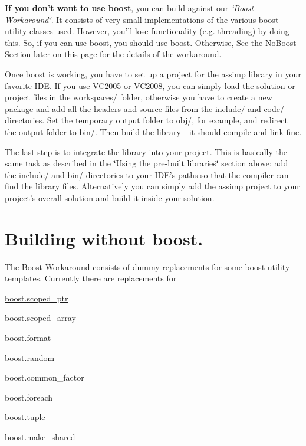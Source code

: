 {\bfseries If you don't want to use boost}, you can build against our {\itshape \char`\"{}\+Boost-\/\+Workaround\char`\"{}}. It consists of very small implementations of the various boost utility classes used. However, you'll lose functionality (e.\+g. threading) by doing this. So, if you can use boost, you should use boost. Otherwise, See the \hyperlink{install_use_noboost}{No\+Boost-\/\+Section } later on this page for the details of the workaround.

Once boost is working, you have to set up a project for the assimp library in your favorite I\+D\+E. If you use V\+C2005 or V\+C2008, you can simply load the solution or project files in the workspaces/ folder, otherwise you have to create a new package and add all the headers and source files from the include/ and code/ directories. Set the temporary output folder to obj/, for example, and redirect the output folder to bin/. Then build the library -\/ it should compile and link fine.

The last step is to integrate the library into your project. This is basically the same task as described in the \char`\"{}\+Using the pre-\/built libraries\char`\"{} section above\+: add the include/ and bin/ directories to your I\+D\+E's paths so that the compiler can find the library files. Alternatively you can simply add the assimp project to your project's overall solution and build it inside your solution.\hypertarget{install_use_noboost}{}\section{Building without boost.}\label{install_use_noboost}
The Boost-\/\+Workaround consists of dummy replacements for some boost utility templates. Currently there are replacements for


\begin{DoxyItemize}
\item \hyperlink{classboost_1_1scoped__ptr}{boost.\+scoped\+\_\+ptr}
\item \hyperlink{classboost_1_1scoped__array}{boost.\+scoped\+\_\+array}
\item \hyperlink{classboost_1_1format}{boost.\+format}
\item boost.\+random
\item boost.\+common\+\_\+factor
\item boost.\+foreach
\item \hyperlink{classboost_1_1tuple}{boost.\+tuple}
\item boost.\+make\+\_\+shared
\end{DoxyItemize}

